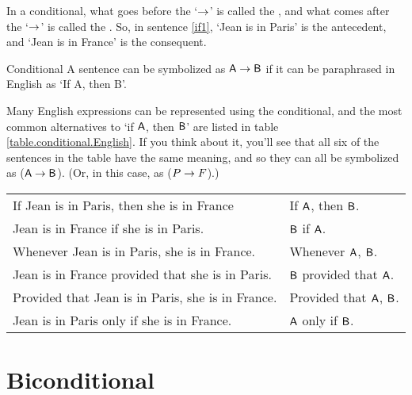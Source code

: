 In a conditional, what goes before the `$\rightarrow$'  is called the , and what comes after the `$\rightarrow$' is called the . So, in sentence \ref{if1}, `Jean is in Paris' is the antecedent, and `Jean is in France' is the consequent.

\begin{factboxy}{Conditional}
A sentence can be symbolized as $\mathsf{A} \rightarrow \mathsf{B}$ if it can be paraphrased in English as `If A, then B'.
\end{factboxy}

Many English expressions can be represented using the conditional, and the most common alternatives to `if $\mathsf{A}$, then $\mathsf{B}$' are listed in table \ref{table.conditional.English}. If you think about it, you'll see that all six of the sentences in the table have the same meaning, and so they can all be symbolized as ($\mathsf{A} \rightarrow \mathsf{B}$). (Or, in this case, as ($P \rightarrow F$).)


\begin{table*}\centering\sffamily\footnotesize
{}
\begin{tabular}{@{}l l@{}}\toprule
If Jean is in Paris, then she is in France & If $\mathsf{A}$, then $\mathsf{B}$.\\
Jean is in France if she is in Paris. 	&	$\mathsf{B}$ if $\mathsf{A}$.\\
Whenever Jean is in Paris, she is in France.  	&	Whenever $\mathsf{A}$, $\mathsf{B}$.\\
Jean is in France provided that she is in Paris. 	&	$\mathsf{B}$ provided that $\mathsf{A}$.\\
Provided that Jean is in Paris, she is in France. 	&	Provided that $\mathsf{A}$, $\mathsf{B}$.\\
Jean is in Paris only if she is in France. 	&	$\mathsf{A}$ only if $\mathsf{B}$.\\
\bottomrule
\end{tabular}
\caption{The most common way of expressing a conditional in English is as `If Jean is in Paris, then she is in France.' This table lists some alternative but equivalent ways of expressing the same sentence.}\label{table.conditional.English}
\end{table*}


\section{Biconditional}\label{s:biconditional-1}

